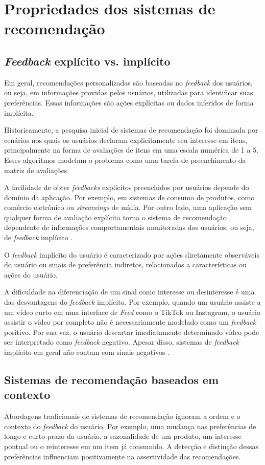 \section{Propriedades dos sistemas de recomendação}
\subsection{\textit{Feedback} explícito vs. implícito}

Em geral, recomendações personalizadas são baseadas no \textit{feedback} dos
usuários, ou seja, em informações providas pelos usuários, utilizadas para
identificar suas preferências. Essas informações são ações explícitas ou dados
inferidos de forma implícita.

Historicamente, a pesquisa inicial de sistemas de recomendação foi dominada por
cenários nos quais os usuários declaram explicitamente seu interesse em itens,
principalmente na forma de avaliações de itens em uma escala numérica de 1 a 5.
Esses algoritmos modelam o problema como uma tarefa de preenchimento da matriz
de avaliações.

A facilidade de obter \textit{feedbacks} explícitos preenchidos por usuários
depende do domínio da aplicação. Por exemplo, em sistemas de consumo de
produtos, como comércio eletrônico ou \textit{streamings} de mídia. Por outro
lado, uma aplicação sem qualquer forma de avaliação explícita torna o sistema de
recomendação dependente de informações comportamentais monitoradas dos usuários,
ou seja, de \textit{feedback} implícito \cite{ludewig2020advances}.

O \textit{feedback} implícito do usuário é caracterizado por ações diretamente
observáveis do usuário ou sinais de preferência indiretos, relacionados a
características ou ações do
usuário.

A dificuldade na diferenciação de um sinal como interesse ou desinteresse é uma
das desvantagens do \textit{feedback} implícito. Por exemplo, quando um usuário
assiste a um vídeo curto em uma interface de \textit{Feed} como o TikTok ou
Instagram, o usuário assistir o vídeo por completo não é necessariamente
modelado como um \textit{feedback} positivo. Por sua vez, o usuário descartar
imediatamente determinado vídeo pode ser interpretado como \textit{feedback}
negativo. Apesar disso, sistemas de \textit{feedback} implícito em geral não contam
com sinais negativos \cite{ludewig2020advances,JLZ18}.

\subsection{Sistemas de recomendação baseados em contexto} Abordagens
tradicionais de sistemas de recomendação ignoram a ordem e o contexto do
\textit{feedback} do usuário. Por exemplo, uma mudança nas preferências de longo
e curto prazo do usuário, a sazonalidade de um produto, um interesse pontual ou
o reinteresse em um item já consumido. A detecção e distinção dessas
preferências influenciam positivamente na assertividade das recomendações.

